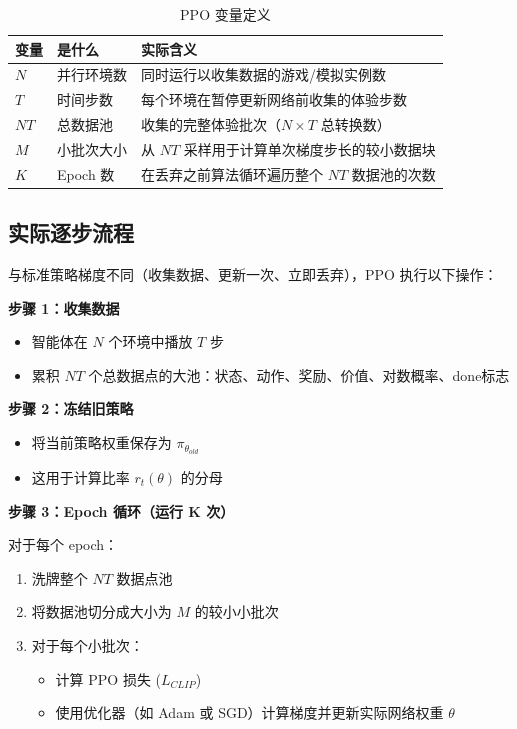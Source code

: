 \documentclass[12pt,a4paper]{article}
\theoremstyle{noteplain}
\theoremstyle{noteexercise}
\begin{document}
\begin{table}[H]
  \centering
  \caption{PPO 变量定义}
  \label{tab:ppo-vars}
  \begin{tabular}{>{\centering\arraybackslash}m{2cm}
                 >{\centering\arraybackslash}m{3cm}
                 >{\centering\arraybackslash}m{6cm}}
    \toprule
    \textbf{变量} & \textbf{是什么} & \textbf{实际含义} \\
    \midrule
    $N$ & 并行环境数 & 同时运行以收集数据的游戏/模拟实例数 \\
    \midrule
    $T$ & 时间步数 & 每个环境在暂停更新网络前收集的体验步数 \\
    \midrule
    $NT$ & 总数据池 &收集的完整体验批次（$N \times T$ 总转换数）\\
    \midrule
    $M$ & 小批次大小 & 从 $NT$ 采样用于计算单次梯度步长的较小数据块 \\
    \midrule
    $K$ & Epoch 数 & 在丢弃之前算法循环遍历整个 $NT$ 数据池的次数 \\
    \bottomrule
  \end{tabular}
\end{table}

\subsection{实际逐步流程}

与标准策略梯度不同（收集数据、更新一次、立即丢弃），PPO 执行以下操作：

\textbf{步骤 1：收集数据}
\begin{itemize}
  \setlength{\itemsep}{0.2em}
  \item 智能体在 $N$ 个环境中播放 $T$ 步
  \item 累积 $NT$ 个总数据点的大池：状态、动作、奖励、价值、对数概率、done标志
\end{itemize}

\textbf{步骤 2：冻结旧策略}
\begin{itemize}
  \setlength{\itemsep}{0.2em}
  \item 将当前策略权重保存为 $\pi_{\theta_{old}}$
  \item 这用于计算比率 $r_t(\theta)$ 的分母
\end{itemize}

\textbf{步骤 3：Epoch 循环（运行 K 次）}

对于每个 epoch：
\begin{enumerate}
  \setlength{\itemsep}{0.2em}
  \item 洗牌整个 $NT$ 数据点池
  \item 将数据池切分成大小为 $M$ 的较小小批次
  \item 对于每个小批次：
    \begin{itemize}
      \setlength{\itemsep}{0.2em}
      \item 计算 PPO 损失 ($L_{CLIP}$)
      \item 使用优化器（如 Adam 或 SGD）计算梯度并更新实际网络权重 $\theta$
    \end{itemize}
\end{enumerate}
\end{document}
